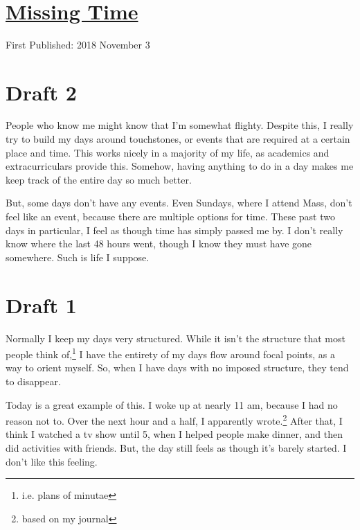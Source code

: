 \documentclass[12pt]{article}[titlepage]
\newcommand{\1}{\={a}}
\newcommand{\2}{\={e}}
\newcommand{\3}{\={\i}}
\newcommand{\4}{\=o}
\newcommand{\5}{\=u}
\newcommand{\6}{\={A}}
\renewcommand{\,}{\textsuperscript{,}}
\begin{document}

\doublespacing
\section{\href{missing-time.html}{Missing Time}}
First Published: 2018 November 3
\section{Draft 2}
People who know me might know that I'm somewhat flighty.
Despite this, I really try to build my days around touchstones, or events that are required at a certain place and time.
This works nicely in a majority of my life, as academics and extracurriculars provide this.
Somehow, having anything to do in a day makes me keep track of the entire day so much better.

But, some days don't have any events.
Even Sundays, where I attend Mass, don't feel like an event, because there are multiple options for time.
These past two days in particular, I feel as though time has simply passed me by.
I don't really know where the last 48 hours went, though I know they must have gone somewhere.
Such is life I suppose.

\section{Draft 1}
Normally I keep my days very structured.
While it isn't the structure that most people think of,\footnote{i.e. plans of minutae} I have the entirety of my days flow around focal points, as a way to orient myself.
So, when I have days with no imposed structure, they tend to disappear.

Today is a great example of this.
I woke up at nearly 11 am, because I had no reason not to.
Over the next hour and a half, I apparently wrote.\footnote{based on my journal}
After that, I think I watched a tv show until 5, when I helped people make dinner, and then did activities with friends.
But, the day still feels as though it's barely started.
I don't like this feeling.
\end{document}
